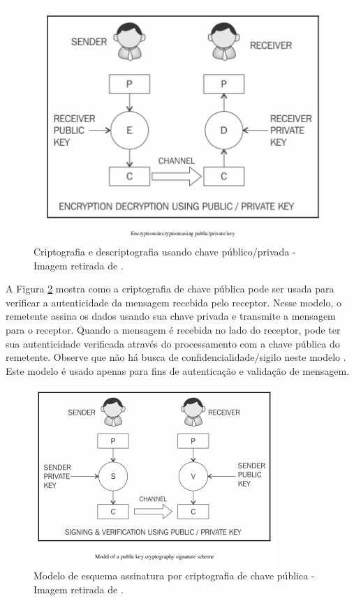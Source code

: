                     \begin{figure}[h]
                         \centering
                         \includegraphics[scale=0.6]{figuras/capitulo_2/public_private_encryption.png}
                         \caption{Criptografia e descriptografia usando chave público/privada - Imagem retirada de \cite{mastering_blockchain}.}
                         \label{fig:public_private_encryption}
                    \end{figure}
                    
                    
                A Figura \ref{fig:public_private_signature} mostra como a criptografia de chave pública pode ser usada para verificar a autenticidade da mensagem recebida pelo receptor. Nesse modelo, o remetente assina os dados usando sua chave privada e transmite a mensagem para o receptor. Quando a mensagem é recebida no lado do receptor, pode ter sua autenticidade verificada através do processamento com a chave pública do remetente. Observe que não há busca de confidencialidade/sigilo neste modelo \cite{mastering_blockchain}. Este modelo é usado apenas para fins de autenticação e validação de mensagem.
                    
                    \begin{figure}[h]
                         \centering
                         \includegraphics[scale=0.7]{figuras/capitulo_2/public_private_signature.png}
                         \caption{Modelo de esquema assinatura por criptografia de chave pública - Imagem retirada de \cite{mastering_blockchain}.}
                         \label{fig:public_private_signature}
                    \end{figure}
                    
